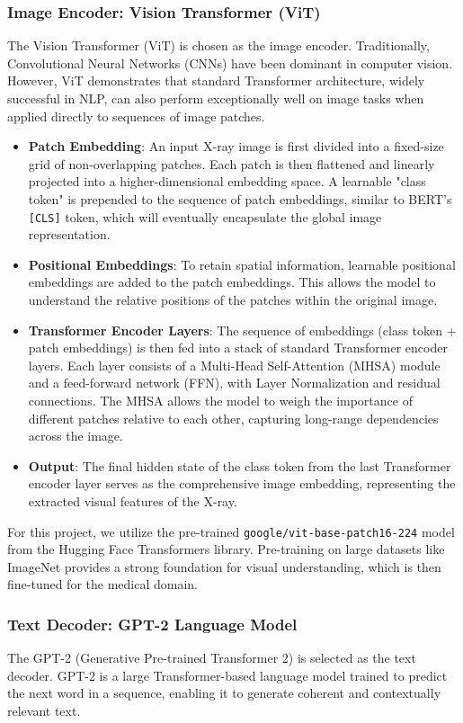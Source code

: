 \documentclass[a4paper, 12pt]{article}
\begin{document}
\subsubsection{Image Encoder: Vision Transformer (ViT)}
The Vision Transformer (ViT) is chosen as the image encoder. Traditionally, Convolutional Neural Networks (CNNs) have been dominant in computer vision. However, ViT demonstrates that standard Transformer architecture, widely successful in NLP, can also perform exceptionally well on image tasks when applied directly to sequences of image patches.

\begin{itemize}
    \item \textbf{Patch Embedding}: An input X-ray image is first divided into a fixed-size grid of non-overlapping patches. Each patch is then flattened and linearly projected into a higher-dimensional embedding space. A learnable "class token" is prepended to the sequence of patch embeddings, similar to BERT's \texttt{[CLS]} token, which will eventually encapsulate the global image representation.
    \item \textbf{Positional Embeddings}: To retain spatial information, learnable positional embeddings are added to the patch embeddings. This allows the model to understand the relative positions of the patches within the original image.
    \item \textbf{Transformer Encoder Layers}: The sequence of embeddings (class token + patch embeddings) is then fed into a stack of standard Transformer encoder layers. Each layer consists of a Multi-Head Self-Attention (MHSA) module and a feed-forward network (FFN), with Layer Normalization and residual connections. The MHSA allows the model to weigh the importance of different patches relative to each other, capturing long-range dependencies across the image.
    \item \textbf{Output}: The final hidden state of the class token from the last Transformer encoder layer serves as the comprehensive image embedding, representing the extracted visual features of the X-ray.
\end{itemize}

For this project, we utilize the pre-trained \texttt{google/vit-base-patch16-224} model from the Hugging Face Transformers library. Pre-training on large datasets like ImageNet provides a strong foundation for visual understanding, which is then fine-tuned for the medical domain.

\subsubsection{Text Decoder: GPT-2 Language Model}
The GPT-2 (Generative Pre-trained Transformer 2) is selected as the text decoder. GPT-2 is a large Transformer-based language model trained to predict the next word in a sequence, enabling it to generate coherent and contextually relevant text.
\end{document}
